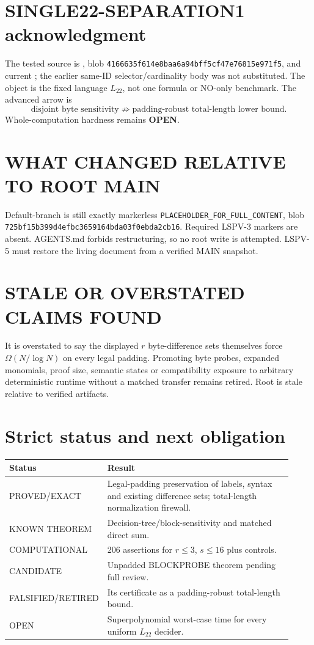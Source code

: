 \documentclass[11pt]{article}
\newcommand{\Ltwo}{L_{22}}
\newcommand{\OPEN}{\textbf{OPEN}}
\begin{document}
\section{SINGLE22-SEPARATION1 acknowledgment}
The tested source is
,
blob \texttt{4166635f614e8baa6a94bff5cf47e76815e971f5}, and current
; the earlier same-ID
selector/cardinality body was not substituted. The object is the fixed
language \(\Ltwo\), not one formula or NO-only benchmark. The advanced arrow is
\[
 \text{disjoint byte sensitivity}\not\Rightarrow
 \text{padding-robust total-length lower bound}.
\]
Whole-computation hardness remains \OPEN.

\section{WHAT CHANGED RELATIVE TO ROOT MAIN}
Default-branch  is still exactly markerless
\texttt{PLACEHOLDER\_FOR\_FULL\_CONTENT}, blob
\texttt{725bf15b399d4efbc3659164bda03f0ebda2cb16}. Required LSPV-3 markers are
absent. AGENTS.md forbids restructuring, so no root write is attempted.
LSPV-5 must restore the living document from a verified MAIN snapshot.

\section{STALE OR OVERSTATED CLAIMS FOUND}
It is overstated to say the displayed $r$ byte-difference sets themselves
force $\Omega(N/\log N)$ on every legal padding. Promoting byte probes,
expanded monomials, proof size, semantic states or compatibility exposure to
arbitrary deterministic runtime without a matched transfer remains retired.
Root  is stale relative to verified artifacts.

\section{Strict status and next obligation}
\begin{center}
\begin{tabular}{p{0.22\linewidth}p{0.70\linewidth}}
\toprule
Status & Result\\
\midrule
PROVED/EXACT & Legal-padding preservation of labels, syntax and existing
difference sets; total-length normalization firewall.\\
KNOWN THEOREM & Decision-tree/block-sensitivity and matched direct sum.\\
COMPUTATIONAL & 206 assertions for $r\le3$, $s\le16$ plus controls.\\
CANDIDATE & Unpadded BLOCKPROBE theorem pending full review.\\
FALSIFIED/RETIRED & Its certificate as a padding-robust total-length bound.\\
OPEN & Superpolynomial worst-case time for every uniform \(\Ltwo\) decider.\\
\bottomrule
\end{tabular}
\end{center}
\end{document}
